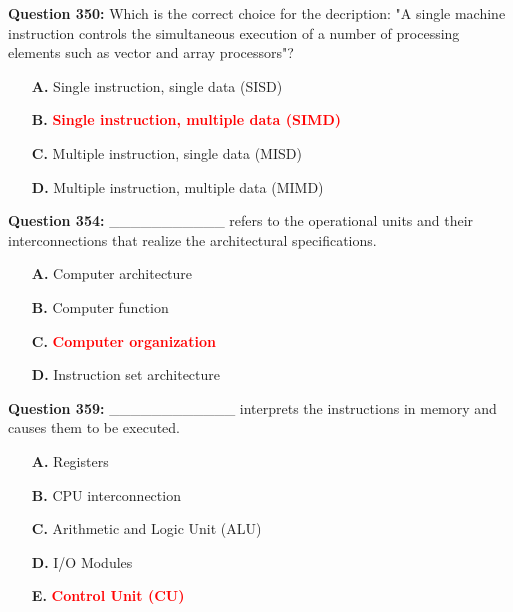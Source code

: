 \documentclass[12pt,a4paper]{article}
\begin{document}
\vspace{0.5cm}

\textbf{Question 350:} Which is the correct choice for the decription: "A single machine instruction controls the simultaneous execution of a number of processing elements such as vector and array processors"?

\begin{itemize}
    \item[\textbf{A.}] Single instruction, single data (SISD)
    \item[\textbf{B.}] \textcolor{red}{\textbf{Single instruction, multiple data (SIMD)}}
    \item[\textbf{C.}] Multiple instruction, single data (MISD)
    \item[\textbf{D.}] Multiple instruction, multiple data (MIMD)
\end{itemize}

\vspace{0.5cm}

\textbf{Question 354:} ___________ refers to the operational units and their interconnections that realize the architectural specifications.

\begin{itemize}
    \item[\textbf{A.}] Computer architecture
    \item[\textbf{B.}] Computer function
    \item[\textbf{C.}] \textcolor{red}{\textbf{Computer organization}}
    \item[\textbf{D.}] Instruction set architecture
\end{itemize}

\vspace{0.5cm}

\textbf{Question 359:} ____________ interprets the instructions in memory and causes them to be executed.

\begin{itemize}
    \item[\textbf{A.}] Registers
    \item[\textbf{B.}] CPU interconnection
    \item[\textbf{C.}] Arithmetic and Logic Unit (ALU)
    \item[\textbf{D.}] I/O Modules
    \item[\textbf{E.}] \textcolor{red}{\textbf{Control Unit (CU)}}
\end{itemize}

\vspace{0.5cm}
\end{document}
